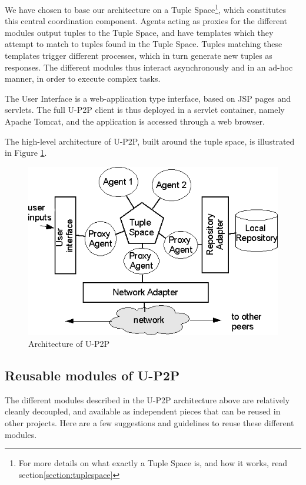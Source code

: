 \documentclass[titlepage]{article}%
\begin{document}
We have chosen to base our architecture on a Tuple Space\footnote{For more details on what exactly a Tuple Space is, and how it works, read section\ref{section:tuplespace}}, which constitutes this central coordination component. Agents acting as proxies for the different modules output tuples to the Tuple Space, and have templates which they attempt to match to tuples found in the Tuple Space. Tuples matching these templates trigger different processes, which in turn generate new tuples as responses. The different modules thus interact asynchronously and in an ad-hoc manner, in order to execute complex tasks.

The User Interface is a web-application type interface, based on JSP pages and servlets. The full U-P2P client is thus deployed in a servlet container, namely Apache Tomcat, and the application is accessed through a web browser. 

The high-level architecture of U-P2P, built around the tuple space, is illustrated in Figure \ref{fig:TSarchitecture}.
\begin{figure}[htb]
	\centering
		\includegraphics[scale=0.75]{diagrams/U-P2Parchitecture.png}
	\caption{Architecture of U-P2P}
	\label{fig:TSarchitecture}
\end{figure}

\subsection{Reusable modules of U-P2P}

The different modules described in the U-P2P architecture above are relatively cleanly decoupled, and available as independent pieces that can be reused in other projects. Here are a few suggestions and guidelines to reuse these different modules.
\end{document}
